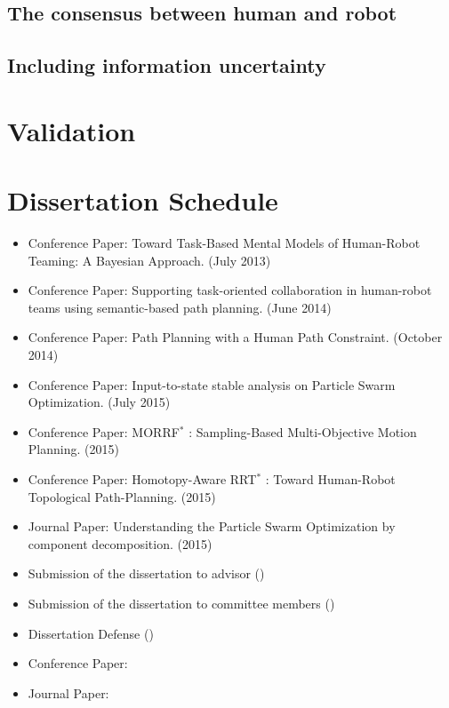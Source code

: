 \documentclass[phd]{byuprop}
\begin{document}
\subsection{The consensus between human and robot}


\subsection{Including information uncertainty}



\section{Validation}

\section{Dissertation Schedule}

\begin{itemize}
\item Conference Paper: Toward Task-Based Mental Models of Human-Robot Teaming: A Bayesian Approach. (July 2013)
\item Conference Paper: Supporting task-oriented collaboration in human-robot teams using semantic-based path planning. (June 2014)
\item Conference Paper: Path Planning with a Human
Path Constraint. (October 2014)
\item Conference Paper: Input-to-state stable analysis on Particle Swarm Optimization. (July 2015)
\item Conference Paper: MORRF$^{*}$ : Sampling-Based Multi-Objective Motion Planning. (2015)
\item Conference Paper: Homotopy-Aware RRT$^{*}$ : Toward Human-Robot Topological Path-Planning. (2015)
\item Journal Paper: Understanding the Particle Swarm Optimization by component decomposition. (2015)
\item Submission of the dissertation to advisor ()
\item Submission of the dissertation to committee members ()
\item Dissertation Defense ()
\item Conference Paper:
\item Journal Paper: 
\end{itemize}



\end{document}
